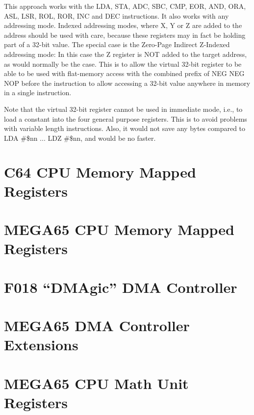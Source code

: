 This approach works with the LDA, STA, ADC, SBC, CMP, EOR, AND, ORA, ASL, LSR, ROL, ROR, INC and DEC instructions.
It also works with any addressing mode.  Indexed addressing modes, where X, Y or Z are added to the address should
be used with care, because these registers may in fact be holding part of a 32-bit value.  The special case is the Zero-Page
Indirect Z-Indexed addressing mode: In this case the Z register is NOT added to the target address, as would normally
be the case. This is to allow the virtual 32-bit register to be able to be used with flat-memory access with the combined prefix of 
NEG NEG NOP before the instruction to allow accessing a 32-bit value anywhere in memory in a single instruction.

Note that the virtual 32-bit register cannot be used in immediate mode, i.e., to load a constant into the four general
purpose registers.  This is to
avoid problems with variable length instructions. Also, it would not save any bytes
compared to LDA #\$nn ... LDZ #\$nn, and would be no faster.


\section{C64 CPU Memory Mapped Registers}



\section{MEGA65 CPU Memory Mapped Registers}



\section{F018 ``DMAgic'' DMA Controller}



\section{MEGA65 DMA Controller Extensions}



\section{MEGA65 CPU Math Unit Registers}



